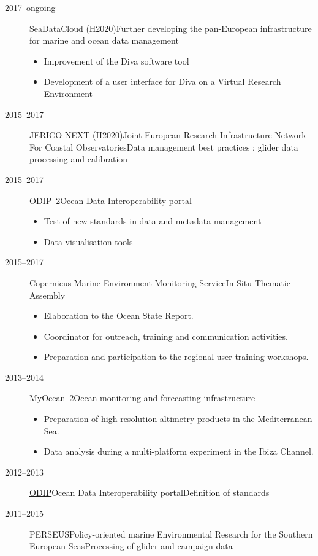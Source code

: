 \documentclass[11pt,a4paper,svgnames]{article}
\begin{document}
\begin{description}
\item[2017--ongoing]{\href{https://www.seadatanet.org}{SeaDataCloud} (H2020)}{Further developing the pan-European infrastructure for marine and ocean data
management}{}{}{
\begin{itemize}
\item Improvement of the Diva software tool
\item Development of a user interface for Diva on a Virtual Research Environment
\end{itemize}
}

\item[2015--2017] {\href{http://www.jerico-ri.eu/}{JERICO-NEXT} (H2020)}{Joint European Research Infrastructure Network For Coastal Observatories}{Data management best practices ; glider data processing and calibration}{}{}
\item[2015--2017] {\href{http://www.odip.eu/}{ODIP~2}}{Ocean Data Interoperability portal}{}{}{
\begin{itemize}
\item Test of new standards in data and metadata management 
\item Data visualisation tools
\end{itemize}
}
\item[2015--2017] {Copernicus Marine Environment Monitoring Service}{In Situ Thematic Assembly}{}{}{
\begin{itemize}
\item Elaboration to the Ocean State Report.
\item Coordinator for outreach, training and communication activities.
\item Preparation and participation to the regional user training workshops.
\end{itemize}
}
\item[2013--2014] {MyOcean~2}{Ocean monitoring and forecasting infrastructure}{}{}{
\begin{itemize}
\item Preparation of high-resolution altimetry products in the Mediterranean Sea.
\item Data analysis during a multi-platform experiment in the Ibiza Channel.
\end{itemize}
}
\item[2012--2013] {\href{http://www.odip.eu/}{ODIP}}{Ocean Data Interoperability portal}{Definition of standards}{}{}
\item[2011--2015] {PERSEUS}{Policy-oriented marine Environmental Research for the Southern European Seas}{Processing of glider and campaign data}{}{}

\end{description}
\end{document}
